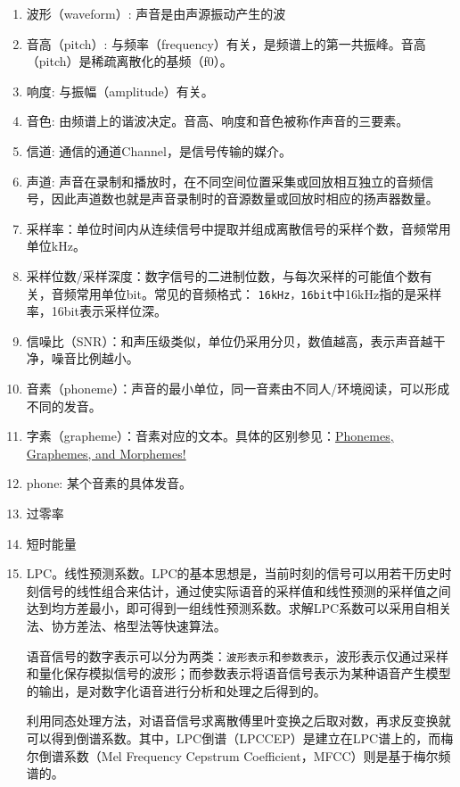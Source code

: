 \documentclass[cn,10pt,math=newtx,citestyle=gb7714-2015,bibstyle=gb7714-2015]{elegantbook}
\begin{document}
\begin{enumerate}
  \item 波形（waveform）: 声音是由声源振动产生的波
  \item 音高（pitch）: 与频率（frequency）有关，是频谱上的第一共振峰。音高（pitch）是稀疏离散化的基频（f0）。
  \item 响度: 与振幅（amplitude）有关。
  \item 音色: 由频谱上的谐波决定。音高、响度和音色被称作声音的三要素。
  \item 信道: 通信的通道Channel，是信号传输的媒介。
  \item 声道: 声音在录制和播放时，在不同空间位置采集或回放相互独立的音频信号，因此声道数也就是声音录制时的音源数量或回放时相应的扬声器数量。
  \item 采样率：单位时间内从连续信号中提取并组成离散信号的采样个数，音频常用单位kHz。
  \item 采样位数/采样深度：数字信号的二进制位数，与每次采样的可能值个数有关，音频常用单位bit。常见的音频格式： \lstinline{16kHz，16bit}中16kHz指的是采样率，16bit表示采样位深。
  \item 信噪比（SNR）：和声压级类似，单位仍采用分贝，数值越高，表示声音越干净，噪音比例越小。
  \item 音素（phoneme）：声音的最小单位，同一音素由不同人/环境阅读，可以形成不同的发音。
  \item 字素（grapheme）：音素对应的文本。具体的区别参见：\href{https://www.youtube.com/watch?v=25r1fyoorko}{Phonemes, Graphemes, and Morphemes!}
  \item phone: 某个音素的具体发音。
  \item 过零率
  \item 短时能量
  \item LPC。线性预测系数。LPC的基本思想是，当前时刻的信号可以用若干历史时刻信号的线性组合来估计，通过使实际语音的采样值和线性预测的采样值之间达到均方差最小，即可得到一组线性预测系数。求解LPC系数可以采用自相关法、协方差法、格型法等快速算法。
  \begin{note}
    语音信号的数字表示可以分为两类：\lstinline{波形表示}和\lstinline{参数表示}，波形表示仅通过采样和量化保存模拟信号的波形；而参数表示将语音信号表示为某种语音产生模型的输出，是对数字化语音进行分析和处理之后得到的。
  \end{note}

  \begin{note}
    利用同态处理方法，对语音信号求离散傅里叶变换之后取对数，再求反变换就可以得到倒谱系数。其中，LPC倒谱（LPCCEP）是建立在LPC谱上的，而梅尔倒谱系数（Mel Frequency Cepstrum Coefficient，MFCC）则是基于梅尔频谱的。
  \end{note}


\end{enumerate}
\end{document}
